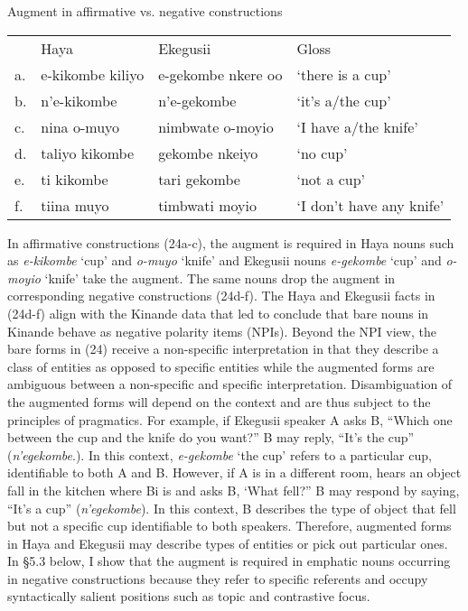 \documentclass[output=paper]{langscibook}
\begin{document}
\begin{exe}
\ex Augment in affirmative vs. negative constructions \\
\label{hayagusii24}
\begin{tabular}{llll}
        &     Haya	&		Ekegusii	&		Gloss		 \\
a. &	e-kikombe kiliyo &	e-gekombe nkere oo	&	‘there is a cup’ 	\\
b. &	n’e-kikombe	&	n’e-gekombe		&	‘it’s a/the cup’ \\
c. &	nina o-muyo &		nimbwate o-moyio	&	‘I have a/the knife’	 \\
d. &	taliyo kikombe	&gekombe nkeiyo	&	‘no cup’ \\ 
e. &	ti kikombe	&	tari gekombe	&		‘not a cup’	 \\	
f. &	tiina muyo	&	timbwati moyio	&	‘I don’t have any knife’ \\
\end{tabular}
\end{exe}
In affirmative constructions (24a-c), the augment is required in Haya nouns such as \textit{e-kikombe} ‘cup’ and \textit{o-muyo} ‘knife’ and Ekegusii nouns \textit{e-gekombe} ‘cup’ and \textit{o-moyio} ‘knife’ take the augment. The same nouns drop the augment in corresponding negative constructions (24d-f). The Haya and Ekegusii facts in (24d-f) align with the Kinande data that led \cite{progovac1993non} to conclude that bare nouns in Kinande behave as negative polarity items (NPIs). Beyond the NPI view, the bare forms in (24) receive a non-specific interpretation in that they describe a class of entities as opposed to specific entities while the augmented forms are ambiguous between a non-specific and specific interpretation. Disambiguation of the augmented forms will depend on the context and are thus subject to the principles of pragmatics. For example, if Ekegusii speaker A asks B, “Which one between the cup and the knife do you want?” B may reply, “It’s the cup” (\textit{n’egekombe}.). In this context, \textit{e-gekombe} ‘the cup’ refers to a particular cup, identifiable to both A and B.  However, if A is in a different room, hears an object fall in the kitchen where Bi is and asks B, ‘What fell?” B may respond by saying, “It’s a cup” (\textit{n’egekombe}). In this context, B describes the type of object that fell but not a specific cup identifiable to both speakers. Therefore, augmented forms in Haya and Ekegusii may describe types of entities or pick out particular ones. In §5.3 below, I show that the augment is required in emphatic nouns occurring in negative constructions because they refer to specific referents and occupy syntactically salient positions such as topic and contrastive focus.
\end{document}
